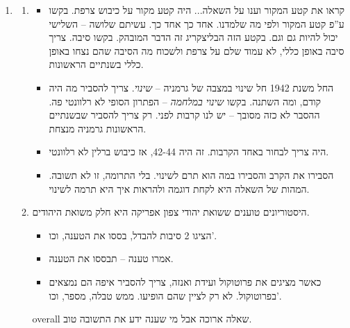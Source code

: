 \documentclass[]{../../../../tex/classes/styledArticle}
\begin{document}
\begin{enumerate}
\begin{enumerate}[A']
\begin{itemize}
			\end{itemize}
		\end{enumerate}
		\item \begin{enumerate}[A']
			\item 
			\begin{itemize}
				\item קראו את קטע המקור וענו על השאלה... היה קטע מקור על כיבוש צרפת. בקשו ע''פ קטע המקור ולפי מה שלמדנו. אחד כך אחד כך. עשיתם שלושה – השלישי יכול להיות גם וגם. בקטע הזה הבליצקריג זה הדבר המובהק. בקשו סיבה. צריך סיבה באופן כללי, לא עמוד שלם על צרפת ולשכוח מה הסיבה שהם נצחו באופן כללי בשנתיים הראשונות. 
				\item החל משנת 1942 חל שינוי במצבה של גרמניה – \textit{שינוי}. צריך להסביר מה היה קודם, ומה השתנה. בקשו \textit{שינוי במלחמה} – הפתרון הסופי לא רלוונטי פה. ההסבר לא כזה מסובך – יש לנו קרבות לפני. רק צריך להסביר שבשנתיים הראשונות גרמניה מנצחת. 
				\item היה צריך לבחור באחד הקרבות. זה היה 42-44, אז כיבוש ברלין לא רלוונטי. 
				\item הסבירו את הקרב והסבירו במה הוא תרם לשינוי. בלי התרומה, זו לא תשובה. המהות של השאלה היא לקחת דוגמה ולהראות איך היא תרמה לשינוי. 
			\end{itemize}
			\item היסטוריונים טוענים ששואת יהודי צפון אפריקה היא חלק משואת היהודים. \begin{itemize}
				\item הציגו 2 סיבות להבדל, בססו את הטענה, וכו'. 
				\item אמרו טענה – תבססו את הטענה. 
				\item כאשר מציגים את פרוטוקול ועידת ואנזה, צריך להסביר איפה הם נמצאים בפרוטוקול. לא רק לציין שהם הופיעו. ממש טבלה, מספר, וכו'. 
			\end{itemize}
			overall שאלה ארוכה אבל מי שענה ידע את התשובה טוב. 
		\end{enumerate}
		

\end{enumerate}
\end{document}
